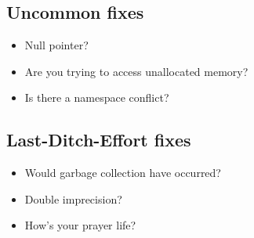 \documentclass[12pt]{article}
\begin{document}
  \subsection{Uncommon fixes}
    \begin{itemize}
      \item Null pointer?
      \item Are you trying to access unallocated memory?
      \item Is there a namespace conflict?
    \end{itemize}
  \subsection{Last-Ditch-Effort fixes}
    \begin{itemize}
      \item Would garbage collection have occurred?
      \item Double imprecision?
      \item How's your prayer life?
    \end{itemize}
\end{document}
